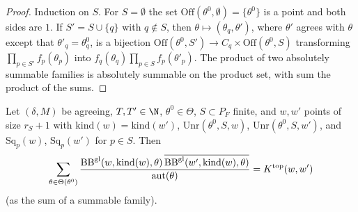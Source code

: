 \begin{proof}
Induction on $S$. For $S=\emptyset$ the set $\mathrm{Off}(\theta^0,\emptyset)=\{\theta^0\}$ is a point and both
sides are $1$. If $S'=S\cup\{q\}$ with $q\notin S$, then $\theta\mapsto(\theta_q,\theta')$, where $\theta'$ agrees with
$\theta$ except that $\theta'_q=\theta^0_q$, is a bijection $\mathrm{Off}(\theta^0,S')\to C_q\times\mathrm{Off}(\theta^0,S)$
transforming $\prod_{p\in S'}f_p(\theta_p)$ into $f_q(\theta_q)\prod_{p\in S}f_p(\theta'_p)$. The product of two absolutely
summable families is absolutely summable on the product set, with sum the product of the sums.
\end{proof}

\begin{proposition}\label{pf:thmS-leaves:prop:ktop}
Let $(\delta,M)$ be agreeing, $T,T'\in\N$, $\theta^0\in\Theta$, $S\subset P_F$ finite, and $w,w'$ points of size
$r_S+1$ with $\mathrm{kind}(w)=\mathrm{kind}(w')$, $\mathrm{Unr}(\theta^0,S,w)$, $\mathrm{Unr}(\theta^0,S,w')$,
and $\mathrm{Sq}_p(w)$, $\mathrm{Sq}_p(w')$ for $p\in S$. Then
\begin{equation}\label{pf:thmS-leaves:eq:ktopexp}
\sum_{\theta\in\Theta(\theta^0)}\frac{\mathrm{BB}^{\mathrm{gl}}(w,\mathrm{kind}(w),\theta)\,
\overline{\mathrm{BB}^{\mathrm{gl}}(w',\mathrm{kind}(w),\theta)}}{\mathrm{aut}(\theta)}=K^{\mathrm{top}}(w,w')
\end{equation}
(as the sum of a summable family).
\end{proposition}

